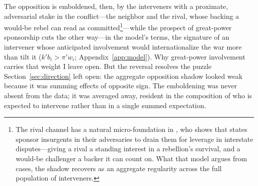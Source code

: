 

The opposition is emboldened, then, by the interveners with a proximate,
adversarial stake in the conflict---the neighbor and the rival, whose backing a
would-be rebel can read as committed\footnote{The rival channel has a natural
micro-foundation in \citet{qiu2022}, who shows that states sponsor insurgents in
their adversaries to drain them for leverage in interstate disputes---giving a
rival a standing interest in a rebellion's survival, and a would-be challenger a
backer it can count on.  What that model argues from cases, the shadow recovers
as an aggregate regularity across the full population of interveners.}---while
the prospect of great-power
sponsorship cuts the other way---in the model's terms, the signature of an
intervener whose anticipated involvement would internationalize the war more
than tilt it ($k' b_i > \pi' w_i$; Appendix~\ref{app:model}).  Why
great-power involvement carries that weight I leave open.  But the reversal
resolves the puzzle Section~\ref{sec:direction} left open: the
aggregate opposition shadow looked weak because it was summing effects of
opposite sign.  The emboldening was never absent from the data; it was averaged
away, resident in the composition of who is expected to intervene rather than in
a single summed expectation.
